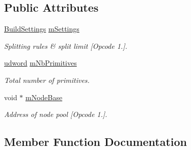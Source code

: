 \subsection*{Public Attributes}
\begin{DoxyCompactItemize}
\item 
\hyperlink{structBuildSettings}{Build\+Settings} \hyperlink{classAABBTreeBuilder_a608e2b63c531582147797a44f797faab}{m\+Settings}\hypertarget{classAABBTreeBuilder_a608e2b63c531582147797a44f797faab}{}\label{classAABBTreeBuilder_a608e2b63c531582147797a44f797faab}

\begin{DoxyCompactList}\small\item\em Splitting rules \& split limit \mbox{[}Opcode 1.\mbox{]}. \end{DoxyCompactList}\item 
\hyperlink{IceTypes_8h_a44c6f1920ba5551225fb534f9d1a1733}{udword} \hyperlink{classAABBTreeBuilder_a25a042f34509d0c94cbd2e825ed9eaca}{m\+Nb\+Primitives}\hypertarget{classAABBTreeBuilder_a25a042f34509d0c94cbd2e825ed9eaca}{}\label{classAABBTreeBuilder_a25a042f34509d0c94cbd2e825ed9eaca}

\begin{DoxyCompactList}\small\item\em Total number of primitives. \end{DoxyCompactList}\item 
void $\ast$ \hyperlink{classAABBTreeBuilder_a8f081024d14f27c49b6734d849f878a4}{m\+Node\+Base}\hypertarget{classAABBTreeBuilder_a8f081024d14f27c49b6734d849f878a4}{}\label{classAABBTreeBuilder_a8f081024d14f27c49b6734d849f878a4}

\begin{DoxyCompactList}\small\item\em Address of node pool \mbox{[}Opcode 1.\mbox{]}. \end{DoxyCompactList}\end{DoxyCompactItemize}


\subsection{Member Function Documentation}
